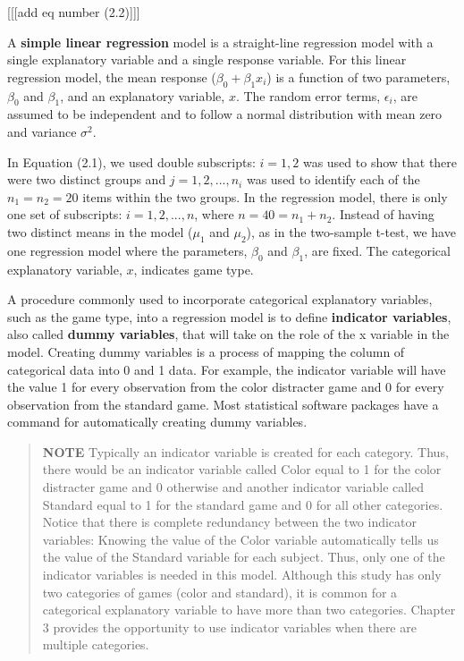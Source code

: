 \documentclass[
]{report}
\theoremstyle{definition}
\theoremstyle{definition}
\theoremstyle{definition}
\theoremstyle{definition}
\theoremstyle{remark}
\begin{document}
{[}{[}{[}add eq number (2.2){]}{]}{]}

A \textbf{simple linear regression} model is a straight-line regression model with a single explanatory variable and a single response variable. For this linear regression model, the mean response (\(\beta_0 + \beta_1x_i\)) is a function of two parameters, \(\beta_0\) and \(\beta_1\), and an explanatory variable, \(x\). The random error terms, \(\epsilon_i\), are assumed to be independent and to follow a normal distribution with mean zero and variance \(\sigma^2\).

In Equation (2.1), we used double subscripts: \(i = 1, 2\) was used to show that there were two distinct groups and \(j = 1, 2, ... , n_i\) was used to identify each of the \(n_1 = n_2 = 20\) items within the two groups. In the regression model, there is only one set of subscripts: \(i = 1, 2, ..., n\), where \(n = 40 = n_1 + n_2\). Instead of having two distinct means in the model (\(\mu_1\) and \(\mu_2\)), as in the two-sample t-test, we have one regression model where the parameters, \(\beta_0\) and \(\beta_1\), are fixed. The categorical explanatory variable, \(x\), indicates game type.

A procedure commonly used to incorporate categorical explanatory variables, such as the game type, into a regression model is to define \textbf{indicator variables}, also called \textbf{dummy variables}, that will take on the role of the x variable in the model. Creating dummy variables is a process of mapping the column of categorical data into 0 and 1 data. For example, the indicator variable will have the value 1 for every observation from the color distracter game and 0 for every observation from the standard game. Most statistical software packages have a command for automatically creating dummy variables.

\begin{quote}
\textbf{NOTE}
Typically an indicator variable is created for each category. Thus, there would be an indicator variable called Color equal to 1 for the color distracter game and 0 otherwise and another indicator variable called Standard equal to 1 for the standard game and 0 for all other categories. Notice that there is complete redundancy between the two indicator variables: Knowing the value of the Color variable automatically tells us the value of the Standard variable for each subject. Thus, only one of the indicator variables is needed in this model. Although this study has only two categories of games (color and standard), it is common for a categorical explanatory variable to have more than two categories. Chapter 3 provides the opportunity to use indicator variables when there are multiple categories.
\end{quote}
\end{document}
